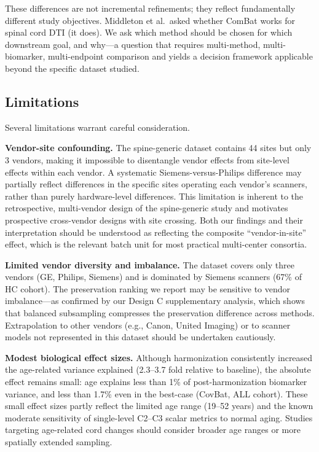 \documentclass[12pt,a4paper]{article}
\begin{document}
These differences are not incremental refinements; they reflect fundamentally different study objectives. Middleton et al.\ asked whether ComBat works for spinal cord DTI (it does). We ask which method should be chosen for which downstream goal, and why---a question that requires multi-method, multi-biomarker, multi-endpoint comparison and yields a decision framework applicable beyond the specific dataset studied.

\subsection{Limitations}

Several limitations warrant careful consideration.

\textbf{Vendor-site confounding.} The spine-generic dataset contains 44 sites but only 3 vendors, making it impossible to disentangle vendor effects from site-level effects within each vendor. A systematic Siemens-versus-Philips difference may partially reflect differences in the specific sites operating each vendor's scanners, rather than purely hardware-level differences. This limitation is inherent to the retrospective, multi-vendor design of the spine-generic study and motivates prospective cross-vendor designs with site crossing. Both our findings and their interpretation should be understood as reflecting the composite ``vendor-in-site'' effect, which is the relevant batch unit for most practical multi-center consortia.

\textbf{Limited vendor diversity and imbalance.} The dataset covers only three vendors (GE, Philips, Siemens) and is dominated by Siemens scanners (67\% of HC cohort). The preservation ranking we report may be sensitive to vendor imbalance---as confirmed by our Design C supplementary analysis, which shows that balanced subsampling compresses the preservation difference across methods. Extrapolation to other vendors (e.g., Canon, United Imaging) or to scanner models not represented in this dataset should be undertaken cautiously.

\textbf{Modest biological effect sizes.} Although harmonization consistently increased the age-related variance explained (2.3--3.7 fold relative to baseline), the absolute effect remains small: age explains less than 1\% of post-harmonization biomarker variance, and less than 1.7\% even in the best-case (CovBat, ALL cohort). These small effect sizes partly reflect the limited age range (19--52 years) and the known moderate sensitivity of single-level C2--C3 scalar metrics to normal aging. Studies targeting age-related cord changes should consider broader age ranges or more spatially extended sampling.
\end{document}

